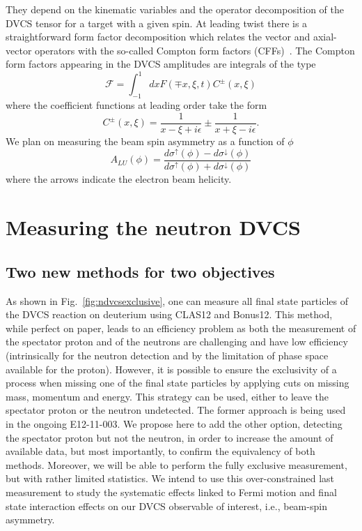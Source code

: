 They depend on the kinematic variables and the operator decomposition of the 
DVCS tensor for a target with a given spin. At leading twist there is a 
straightforward form factor decomposition which relates the vector and 
axial-vector operators with the so-called Compton form factors 
(CFFs)~\cite{Belitsky:2000gz}. The Compton form factors appearing in the DVCS 
amplitudes are integrals of the type
%
%
\begin{equation}
   \mathcal{F} = \int_{-1}^{1} dx F(\mp x,\xi,t) C^{\pm}(x,\xi)
\end{equation}
where the coefficient functions at leading order take the form
\begin{equation}
   C^{\pm}(x,\xi) = \frac{1}{x-\xi + i\epsilon} \pm \frac{1}{x+\xi - 
   i\epsilon}.
\end{equation}
%
We plan on measuring the beam spin asymmetry as a function of $\phi$
\begin{equation}
   A_{LU}(\phi) = \frac{d\sigma^{\uparrow}(\phi) - 
   d\sigma^{\downarrow}(\phi)}{d\sigma^{\uparrow}(\phi) + 
   d\sigma^{\downarrow}(\phi)}
\end{equation}
%
where the arrows indicate the electron beam helicity. 

\section{Measuring the neutron DVCS}

\subsection{Two new methods for two objectives}

As shown in Fig.~\ref{fig:ndvcsexclusive}, one can measure all final state 
particles of the DVCS reaction on deuterium using CLAS12 and Bonus12. This 
method, while perfect on paper, leads to an efficiency problem
as both the measurement of the spectator proton and of the neutrons are challenging
and have low efficiency (intrinsically for the neutron detection and by the 
limitation of phase space available for the proton). However, it is possible to 
ensure the exclusivity of a process when missing one of the final state 
particles by applying cuts on missing mass, momentum and energy. This strategy 
can be used, either to leave the spectator proton or the neutron undetected.  
The former approach is being used in the ongoing E12-11-003. We propose here to 
add the other option, detecting the spectator proton but not the neutron, in 
order to increase the amount of available data, but most importantly, to 
confirm the equivalency of both methods. Moreover, we will be able to
perform the fully exclusive measurement, but with rather limited statistics. We
intend to use this over-constrained last measurement to study the systematic 
effects linked to Fermi motion and final state interaction effects on our DVCS 
observable of interest, i.e., beam-spin asymmetry.

